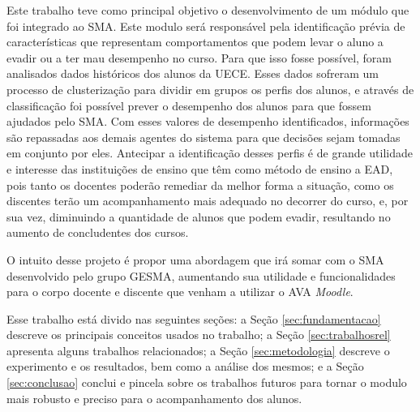 Este trabalho teve como principal objetivo o desenvolvimento de um módulo que foi integrado ao SMA. Este modulo será responsável pela identificação prévia de características que representam comportamentos que podem levar o aluno a evadir ou a ter mau desempenho no curso. Para que isso fosse possível, foram analisados dados históricos dos alunos da UECE. Esses dados sofreram um processo de clusterização para dividir em grupos os perfis dos alunos, e através de classificação foi possível prever o desempenho dos alunos para que fossem ajudados pelo SMA. Com esses valores de desempenho identificados, informações são repassadas aos demais agentes do sistema para que decisões sejam tomadas em conjunto por eles. Antecipar a identificação desses perfis é de grande utilidade e interesse das instituições de ensino que têm como método de ensino a EAD, pois tanto os docentes poderão remediar da melhor forma a situação, como os discentes terão um acompanhamento mais adequado no decorrer do curso, e, por sua vez, diminuindo a quantidade de alunos que podem evadir, resultando no aumento de concludentes dos cursos.

O intuito desse projeto é propor uma abordagem que irá somar com o SMA desenvolvido pelo grupo GESMA, aumentando sua utilidade e funcionalidades para o corpo docente e discente que venham a utilizar o AVA \textit{Moodle}.

Esse trabalho está divido nas seguintes seções: a Seção \ref{sec:fundamentacao} descreve os principais conceitos usados no trabalho; a Seção \ref{sec:trabalhosrel} apresenta alguns trabalhos relacionados; a Seção \ref{sec:metodologia} descreve o experimento e os resultados, bem como a análise dos mesmos; e a Seção \ref{sec:conclusao} conclui e pincela sobre os trabalhos futuros para tornar o modulo mais robusto e preciso para o acompanhamento dos alunos.
